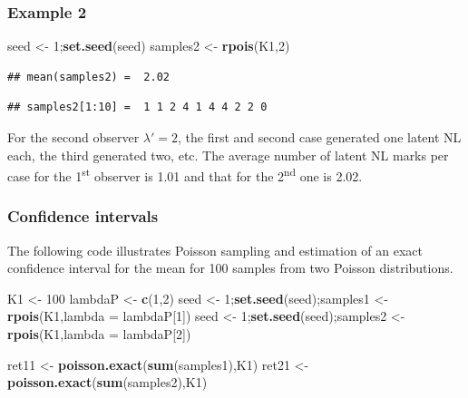 \documentclass[
]{book}
\newenvironment{Shaded}{\begin{snugshade}}{\end{snugshade}}
\newcommand{\DataTypeTok}[1]{\textcolor[rgb]{0.13,0.29,0.53}{#1}}
\newcommand{\DecValTok}[1]{\textcolor[rgb]{0.00,0.00,0.81}{#1}}
\newcommand{\KeywordTok}[1]{\textcolor[rgb]{0.13,0.29,0.53}{\textbf{#1}}}
\newcommand{\NormalTok}[1]{#1}
\newcommand{\StringTok}[1]{\textcolor[rgb]{0.31,0.60,0.02}{#1}}
\begin{document}
\hypertarget{example-2}{%
\subsubsection{Example 2}\label{example-2}}

\begin{Shaded}
\begin{Highlighting}[]
\NormalTok{seed <-}\StringTok{ }\DecValTok{1}\NormalTok{;}\KeywordTok{set.seed}\NormalTok{(seed)}
\NormalTok{samples2 <-}\StringTok{ }\KeywordTok{rpois}\NormalTok{(K1,}\DecValTok{2}\NormalTok{)}
\end{Highlighting}
\end{Shaded}

\begin{verbatim}
## mean(samples2) =  2.02
\end{verbatim}

\begin{verbatim}
## samples2[1:10] =  1 1 2 4 1 4 4 2 2 0
\end{verbatim}

For the second observer \(\lambda' = 2\), the first and second case generated one latent NL each, the third generated two, etc. The average number of latent NL marks per case for the 1\textsuperscript{st} observer is 1.01 and that for the 2\textsuperscript{nd} one is 2.02.

\hypertarget{confidence-intervals}{%
\subsubsection{Confidence intervals}\label{confidence-intervals}}

The following code illustrates Poisson sampling and estimation of an exact confidence interval for the mean for 100 samples from two Poisson distributions.

\begin{Shaded}
\begin{Highlighting}[]
\NormalTok{K1 <-}\StringTok{ }\DecValTok{100}
\NormalTok{lambdaP <-}\StringTok{ }\KeywordTok{c}\NormalTok{(}\DecValTok{1}\NormalTok{,}\DecValTok{2}\NormalTok{)}
\NormalTok{seed <-}\StringTok{ }\DecValTok{1}\NormalTok{;}\KeywordTok{set.seed}\NormalTok{(seed);samples1 <-}\StringTok{ }\KeywordTok{rpois}\NormalTok{(K1,}\DataTypeTok{lambda =}\NormalTok{ lambdaP[}\DecValTok{1}\NormalTok{])}
\NormalTok{seed <-}\StringTok{ }\DecValTok{1}\NormalTok{;}\KeywordTok{set.seed}\NormalTok{(seed);samples2 <-}\StringTok{ }\KeywordTok{rpois}\NormalTok{(K1,}\DataTypeTok{lambda =}\NormalTok{ lambdaP[}\DecValTok{2}\NormalTok{])}

\NormalTok{ret11 <-}\StringTok{ }\KeywordTok{poisson.exact}\NormalTok{(}\KeywordTok{sum}\NormalTok{(samples1),K1)}
\NormalTok{ret21 <-}\StringTok{ }\KeywordTok{poisson.exact}\NormalTok{(}\KeywordTok{sum}\NormalTok{(samples2),K1)}
\end{Highlighting}
\end{Shaded}
\end{document}

